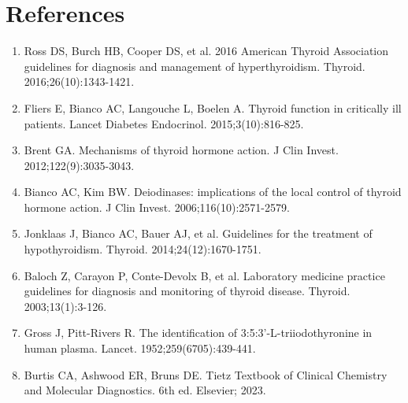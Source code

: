 \section*{References}
\begin{enumerate}
  \item Ross DS, Burch HB, Cooper DS, et al. 2016 American Thyroid Association guidelines for diagnosis and management of hyperthyroidism. Thyroid. 2016;26(10):1343-1421.
  \item Fliers E, Bianco AC, Langouche L, Boelen A. Thyroid function in critically ill patients. Lancet Diabetes Endocrinol. 2015;3(10):816-825.
  \item Brent GA. Mechanisms of thyroid hormone action. J Clin Invest. 2012;122(9):3035-3043.
  \item Bianco AC, Kim BW. Deiodinases: implications of the local control of thyroid hormone action. J Clin Invest. 2006;116(10):2571-2579.
  \item Jonklaas J, Bianco AC, Bauer AJ, et al. Guidelines for the treatment of hypothyroidism. Thyroid. 2014;24(12):1670-1751.
  \item Baloch Z, Carayon P, Conte-Devolx B, et al. Laboratory medicine practice guidelines for diagnosis and monitoring of thyroid disease. Thyroid. 2003;13(1):3-126.
  \item Gross J, Pitt-Rivers R. The identification of 3:5:3'-L-triiodothyronine in human plasma. Lancet. 1952;259(6705):439-441.
  \item Burtis CA, Ashwood ER, Bruns DE. Tietz Textbook of Clinical Chemistry and Molecular Diagnostics. 6th ed. Elsevier; 2023.
\end{enumerate}

\clearpage

